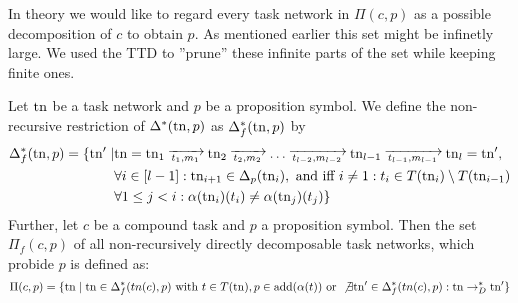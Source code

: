 \documentclass{scrartcl}
\begin{document}
In theory we would like to regard every task network in $\Pi(c,p)$ as a possible decomposition of $c$ to obtain $p$.
As mentioned earlier this set might be infinetly large.
We used the TTD to ''prune'' these infinite parts of the set while keeping finite ones.

\begin{definition}
Let $\mathrm{tn}$ be a task network and $p$ be a proposition symbol.
We define the non-recursive restriction of $\Delta^*(\mathrm{tn},p)$ as $\Delta_f^*(\mathrm{tn},p)$ by
\begin{align*}
\Delta^*_f(\tn,p) = \{\tn' \mid &\tn = \tn_1 \decompose{t_1}{m_1} \tn_2 \decompose{t_2}{m_2} \dots \decompose{t_{l-2}}{m_{l-2}} \tn_{l-1} \decompose{t_{l-1}}{m_{l-1}} \tn_l = \tn', \\
& \forall i \in [l-1]: \tn_{i+1} \in \Delta_p(\tn_i), \text{ and iff } i\neq 1: t_i \in T(\tn_i) \setminus T(\tn_{i-1})\\
& \forall 1 \leq j < i: \alpha(\tn_i)(t_i) \neq \alpha(\tn_j)(t_j) \}
\end{align*}
Further, let $c$ be a compound task and $p$ a proposition symbol.
Then the set $\Pi_f(c,p)$ of all non-recursively directly decomposable task networks, which probide $p$ is defined as:
\[\Pi(c,p) = \{\mathrm{tn} \mid \mathrm{tn} \in \Delta_f^*(tn(c),p)\text{ with } t \in T(\mathrm{tn}), p \in \text{add}(\alpha(t)) \text { or } \not\exists \mathrm{tn}' \in \Delta_f^*(tn(c),p) : \mathrm{tn} \rightarrow_D^* \mathrm{tn}'\}\]

\end{definition}
\end{document}
